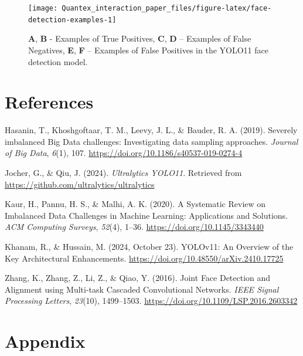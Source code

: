 \documentclass[
  man,floatsintext]{apa6}
\newlength{\cslhangindent}
\newenvironment{CSLReferences}[2] %
 {\begin{list}{}{%
  \setlength{\itemindent}{0pt}
  \setlength{\leftmargin}{0pt}
  \setlength{\parsep}{0pt}
  \ifodd #1
   \setlength{\leftmargin}{\cslhangindent}
   \setlength{\itemindent}{-1\cslhangindent}
  \fi
  \setlength{\itemsep}{#2\baselineskip}}}
 {\end{list}}
\begin{document}
\begin{figure}

{\centering \texttt{[image: Quantex\_interaction\_paper\_files/figure-latex/face-detection-examples-1]} 

}

\caption{\textbf{A}, \textbf{B} - Examples of True Positives, \textbf{C}, \textbf{D} – Examples of False Negatives, \textbf{E}, \textbf{F} – Examples of False Positives in the YOLO11 face detection model.}\label{fig:face-detection-examples}
\end{figure}

\newpage

\section{References}\label{references-1}

\begingroup
\setlength{\parindent}{-0.5in}
\setlength{\leftskip}{0.5in}

\label{refs}
\begin{CSLReferences}{1}{0}
Hasanin, T., Khoshgoftaar, T. M., Leevy, J. L., \& Bauder, R. A. (2019). Severely imbalanced {Big Data} challenges: Investigating data sampling approaches. \emph{Journal of Big Data}, \emph{6}(1), 107. \url{https://doi.org/10.1186/s40537-019-0274-4}

Jocher, G., \& Qiu, J. (2024). \emph{Ultralytics {YOLO11}}. Retrieved from \url{https://github.com/ultralytics/ultralytics}

Kaur, H., Pannu, H. S., \& Malhi, A. K. (2020). A {Systematic Review} on {Imbalanced Data Challenges} in {Machine Learning}: {Applications} and {Solutions}. \emph{ACM Computing Surveys}, \emph{52}(4), 1--36. \url{https://doi.org/10.1145/3343440}

Khanam, R., \& Hussain, M. (2024, October 23). {YOLOv11}: {An Overview} of the {Key Architectural Enhancements}. \url{https://doi.org/10.48550/arXiv.2410.17725}

Zhang, K., Zhang, Z., Li, Z., \& Qiao, Y. (2016). Joint {Face Detection} and {Alignment} using {Multi-task Cascaded Convolutional Networks}. \emph{IEEE Signal Processing Letters}, \emph{23}(10), 1499--1503. \url{https://doi.org/10.1109/LSP.2016.2603342}

\end{CSLReferences}

\endgroup

\newpage

\section{Appendix}\label{appendix}
\end{document}
